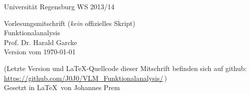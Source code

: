 \begin{titlepage}
    \Large
        Universität Regensburg \hfill WS 2013/14 \\
    \vspace{4cm}
    \begin{center}
        \small
        Vorlesungsmitschrift (\emph{kein} offizielles Skript)\\[1cm]
        \Huge 
            Funktionalanalysis\\[2cm]
        \Large
            Prof. Dr. Harald Garcke\\
        \vfill
        \small
            Version vom \today
        
        \footnotesize
        \smallskip
            (Letzte Version und \LaTeX-Quellcode dieser Mitschrift befinden
            sich auf github: 
            \url{https://github.com/J0J0/VLM_Funktionalanalysis/}\,)%
        \\[2cm]
        \small
            Gesetzt in \LaTeX\ von Johannes Prem
        \vspace*{1cm}
    \end{center}
\end{titlepage}

